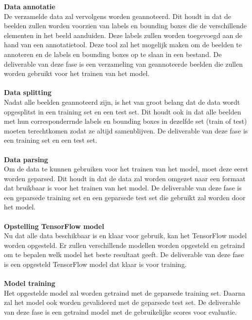 \textbf{Data annotatie} \\
De verzamelde data zal vervolgens worden geannoteerd. Dit houdt in dat de beelden zullen worden voorzien van labels en bounding boxes die de verschillende elementen in het beeld aanduiden. 
Deze labels zullen worden toegevoegd aan de hand van een annotatietool. Deze tool zal het mogelijk maken om de beelden te annoteren en de labels en bounding boxes op te slaan in een bestand.
De deliverable van deze fase is een verzameling van geannoteerde beelden die zullen worden gebruikt voor het trainen van het model.
\\\\

\textbf{Data splitting} \\
Nadat alle beelden geannoteerd zijn, is het van groot belang dat de data wordt opgesplitst in een training set en een test set.
Dit houdt ook in dat alle beelden met hun corresponderrnde labels en bounding boxes in dezelfde set (train of test) moeten terechtkomen zodat ze altijd samenblijven.
De deliverable van deze fase is een training set en een test set.
\\\\

\textbf{Data parsing} \\
Om de data te kunnen gebruiken voor het trainen van het model, moet deze eerst worden geparsed. 
Dit houdt in dat de data zal worden omgezet naar een formaat dat bruikbaar is voor het trainen van het model.
De deliverable van deze fase is een geparsede training set en een geparsede test set die gebruikt zal worden door het model.
\\\\

\textbf{Opstelling TensorFlow model} \\
Nu dat alle data beschikbaar is en klaar voor gebruik, kan het TensorFlow model worden opgesteld.
Er zullen verschillende modellen worden opgesteld en getraind om te bepalen welk model het beste resultaat geeft.
De deliverable van deze fase is een opgesteld TensorFlow model dat klaar is voor training.
\\\\

\textbf{Model training} \\
Het opgestelde model zal worden getraind met de geparsede training set. Daarna zal het model ook worden gevalideerd met de geparsede test set.
De deliverable van deze fase is een getraind model met de gebruikelijke scores voor evaluatie.
\\\\

